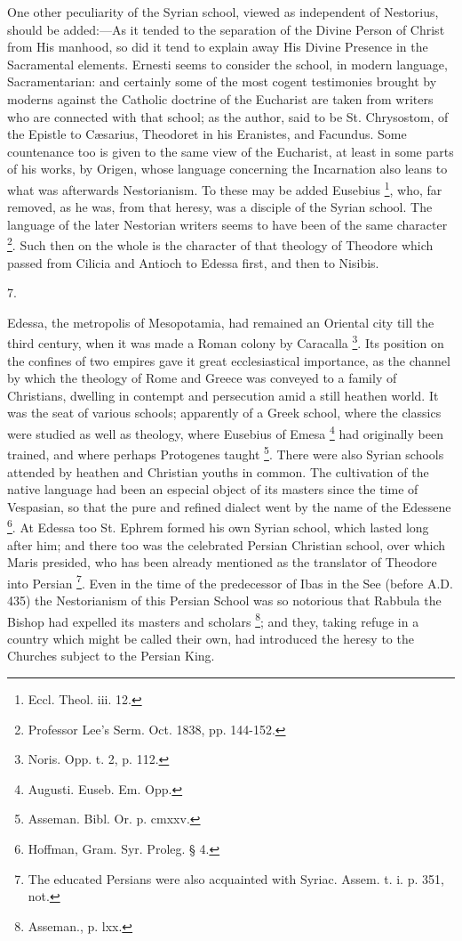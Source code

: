 One other peculiarity of the Syrian school, viewed as independent
of Nestorius, should be added:—As it tended to the separation of the
Divine Person of Christ from His manhood, so did it tend to explain
away His Divine Presence in the Sacramental elements. Ernesti seems to
consider the school, in modern language, Sacramentarian: and certainly
some of the most cogent testimonies brought by moderns against the
Catholic doctrine of the Eucharist are taken from writers who are
connected with that school; as the author, said to be St. Chrysostom,
of the Epistle to Cæsarius, Theodoret in his Eranistes, and Facundus.
Some countenance too is given to the same view of the Eucharist, at
least in some parts of his works, by Origen, whose language concerning
the Incarnation also leans to what was afterwards Nestorianism. To
these may be added Eusebius \footnote{Eccl. Theol. iii. 12.},
who, far removed, as he was, from that heresy, was a disciple of the
Syrian school. The language of the later Nestorian writers seems to
have been of the same character \footnote{Professor Lee's Serm. Oct. 1838, pp.
144-152.}. Such then on the whole is the character of that theology of
Theodore which passed from Cilicia and Antioch to Edessa first, and
then to Nisibis.

7.

Edessa, the metropolis of Mesopotamia, had remained an Oriental
city till the third century, when it was made a Roman colony by
Caracalla \footnote{Noris. Opp. t. 2, p. 112.}. Its
position on the confines of two empires gave it great ecclesiastical
importance, as the channel by which the theology of Rome and Greece
was conveyed to a family of Christians, dwelling in contempt and
persecution amid a still heathen world. It was the seat of various
schools; apparently of a Greek school, where the classics were studied
as well as theology, where Eusebius of Emesa \footnote{Augusti. Euseb. Em. Opp.} had originally been trained, and where perhaps Protogenes
taught \footnote{Asseman. Bibl. Or. p. cmxxv.}. There were
also Syrian schools attended by heathen and Christian youths in
common. The cultivation of the native language had been an especial
object of its masters since the time of Vespasian, so that the pure
and refined dialect went by the name of the Edessene \footnote{Hoffman, Gram. Syr. Proleg. § 4.}. At Edessa too St. Ephrem formed his own Syrian school, which
lasted long after him; and there too was the celebrated Persian
Christian school, over which Maris presided, who has been already
mentioned as the translator of Theodore into Persian \footnote{The educated Persians were also acquainted
with Syriac. Assem. t. i. p. 351, not.}. Even in the time of the predecessor of Ibas in the See
(before A.D. 435) the Nestorianism of this Persian School was so
notorious that Rabbula the Bishop had expelled its masters and
scholars \footnote{Asseman., p. lxx.}; and they,
taking refuge in a country which might be called their own, had
introduced the heresy to the Churches subject to the Persian King.

